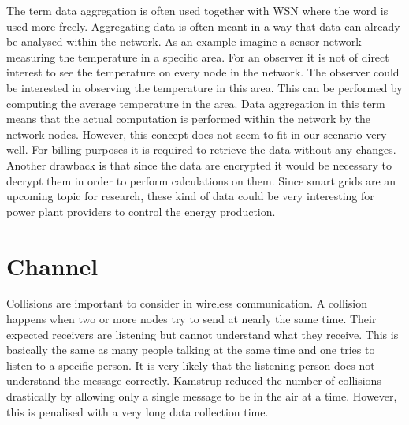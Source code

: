 The term data aggregation is often used together with WSN where the word is used more freely. Aggregating data is often meant in a way that data can already be analysed within the network. As an example imagine a sensor network measuring the temperature in a specific area. For an observer it is not of direct interest to see the temperature on every node in the network. The observer could be interested in observing the temperature in this area. This can be performed by computing the average temperature in the area. Data aggregation in this term means that the actual computation is performed within the network by the network nodes. However, this concept does not seem to fit in our scenario very well. For billing purposes it is required to retrieve the data without any changes. Another drawback is that since the data are encrypted it would be necessary to decrypt them in order to perform calculations on them. Since smart grids are an upcoming topic for research, these kind of data could be very interesting for power plant providers to control the energy production.

\section{Channel}
Collisions are important to consider in wireless communication. A collision happens when two or more nodes try to send at nearly the same time. Their expected receivers are listening but cannot understand what they receive. This is basically the same as many people talking at the same time and one tries to listen to a specific person. It is very likely that the listening person does not understand the message correctly. Kamstrup reduced the number of collisions drastically by allowing only a single message to be in the air at a time. However, this is penalised with a very long data collection time.

